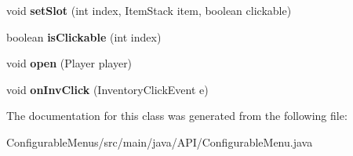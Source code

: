 \begin{DoxyCompactItemize}
\item 
\mbox{\label{class_a_p_i_1_1_configurable_menu_a5a654726058acf267a272ca5ed9ee052}} 
void {\bfseries set\+Slot} (int index, Item\+Stack item, boolean clickable)
\item 
\mbox{\label{class_a_p_i_1_1_configurable_menu_a6427862ff2f8ff423f4df4d4f5944804}} 
boolean {\bfseries is\+Clickable} (int index)
\item 
\mbox{\label{class_a_p_i_1_1_configurable_menu_a1ddf6dac6c67800d1b51539c9d43b36c}} 
void {\bfseries open} (Player player)
\item 
\mbox{\label{class_a_p_i_1_1_configurable_menu_aa95f124ac5d0fc3639e019ae26778925}} 
void {\bfseries on\+Inv\+Click} (Inventory\+Click\+Event e)
\end{DoxyCompactItemize}


The documentation for this class was generated from the following file\+:\begin{DoxyCompactItemize}
\item 
Configurable\+Menus/src/main/java/\+A\+P\+I/Configurable\+Menu.\+java\end{DoxyCompactItemize}
